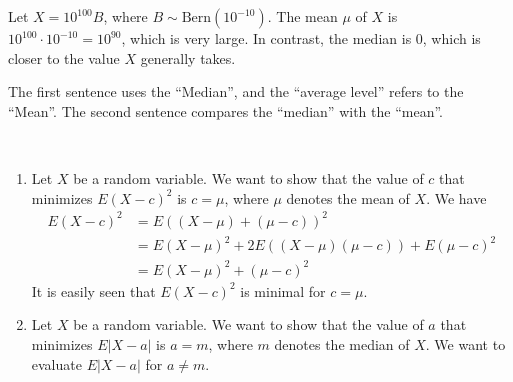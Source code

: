 \begin{Solution}{1.1}
			Let $X = 10^{100} B$, where $B \sim \text{Bern}(10^{-10})$. The mean $\mu$ of $X$ is $10^{100} \cdot 10^{-10} = 10^{90}$, which is very large. In contrast, the median is 0, which is closer to the value $X$ generally takes.
		
\end{Solution}
\begin{Solution}{1.2}
			The first sentence uses the ``Median'', and the ``average level'' refers to the ``Mean''.  The second sentence compares the ``median'' with the ``mean''.
		
\end{Solution}
\begin{Solution}{1.3}
~
			\begin{enumerate}
				\item Let $X$ be a random variable. We want to show that the value of $c$ that minimizes $E(X - c)^2$ is $c = \mu$, where $\mu$ denotes the mean of $X$. We have
				\begin{align*}
					E(X - c)^2 & = E((X - \mu) + (\mu - c))^2 \\
					& = E(X - \mu)^2 + 2 E((X - \mu)(\mu - c)) + E(\mu - c)^2 \\
					& = E(X - \mu)^2 + (\mu - c)^2
				\end{align*}
				It is easily seen that $E(X - c)^2$ is minimal for $c = \mu$.
				\item Let $X$ be a random variable. We want to show that the value of $a$ that minimizes $E|X - a|$ is $a = m$, where $m$ denotes the median of $X$. We want to evaluate $E|X - a|$ for $a \neq m$.
					

\end{enumerate}
\end{Solution}
